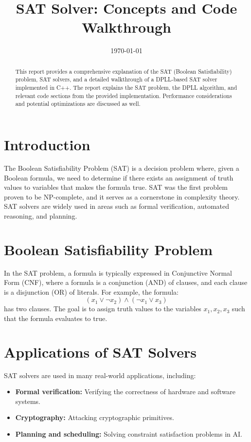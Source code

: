 \documentclass[12pt]{article}
\title{SAT Solver: Concepts and Code Walkthrough}
\author{}
\date{\today}
\begin{document}
\maketitle

\begin{abstract}
This report provides a comprehensive explanation of the SAT (Boolean Satisfiability) problem, SAT solvers, and a detailed walkthrough of a DPLL-based SAT solver implemented in C++. The report explains the SAT problem, the DPLL algorithm, and relevant code sections from the provided implementation. Performance considerations and potential optimizations are discussed as well.
\end{abstract}

\section{Introduction}
The Boolean Satisfiability Problem (SAT) is a decision problem where, given a Boolean formula, we need to determine if there exists an assignment of truth values to variables that makes the formula true. SAT was the first problem proven to be NP-complete, and it serves as a cornerstone in complexity theory. SAT solvers are widely used in areas such as formal verification, automated reasoning, and planning.

\section{Boolean Satisfiability Problem}
In the SAT problem, a formula is typically expressed in Conjunctive Normal Form (CNF), where a formula is a conjunction (AND) of clauses, and each clause is a disjunction (OR) of literals. For example, the formula:
\begin{equation}
(x_1 \lor \neg x_2) \land (\neg x_1 \lor x_3)
\end{equation}
has two clauses. The goal is to assign truth values to the variables $x_1, x_2, x_3$ such that the formula evaluates to true.

\section{Applications of SAT Solvers}
SAT solvers are used in many real-world applications, including:
\begin{itemize}
    \item \textbf{Formal verification:} Verifying the correctness of hardware and software systems.
    \item \textbf{Cryptography:} Attacking cryptographic primitives.
    \item \textbf{Planning and scheduling:} Solving constraint satisfaction problems in AI.
\end{itemize}
\end{document}
